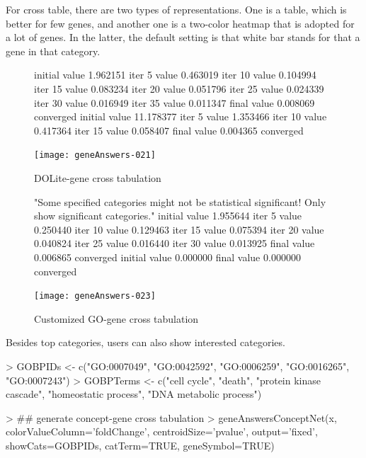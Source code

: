 \documentclass[a4paper]{article}
\begin{document}
For cross table, there are two types of representations. One is a table, which is better for few genes, and another one is a two-color heatmap that is adopted for a lot of genes. In the latter,  the default setting is that white bar stands for that a gene in that category.

 
\begin{figure}
\centering
\begin{Schunk}
\begin{Soutput}
initial  value 1.962151 
iter   5 value 0.463019
iter  10 value 0.104994
iter  15 value 0.083234
iter  20 value 0.051796
iter  25 value 0.024339
iter  30 value 0.016949
iter  35 value 0.011347
final  value 0.008069 
converged
initial  value 11.178377 
iter   5 value 1.353466
iter  10 value 0.417364
iter  15 value 0.058407
final  value 0.004365 
converged
\end{Soutput}
\end{Schunk}
\texttt{[image: geneAnswers-021]}
\caption{DOLite-gene cross tabulation}
\label{fig:DOLite-gene cross tabulation}
\end{figure}


\begin{figure}
\centering
\begin{Schunk}
\begin{Soutput}
[1] "Some specified categories might not be statistical significant! Only show significant categories."
initial  value 1.955644 
iter   5 value 0.250440
iter  10 value 0.129463
iter  15 value 0.075394
iter  20 value 0.040824
iter  25 value 0.016440
iter  30 value 0.013925
final  value 0.006865 
converged
initial  value 0.000000 
final  value 0.000000 
converged
\end{Soutput}
\end{Schunk}
\texttt{[image: geneAnswers-023]}
\caption{Customized GO-gene cross tabulation}
\label{fig: Customized GO-gene cross tabulation}
\end{figure}


Besides top categories, users can also show interested categories.
\begin{Schunk}
\begin{Sinput}
> GOBPIDs <- c("GO:0007049", "GO:0042592", "GO:0006259", "GO:0016265", "GO:0007243")
> GOBPTerms <- c("cell cycle", "death", "protein kinase cascade", "homeostatic process", "DNA metabolic process") 
\end{Sinput}
\end{Schunk}

\begin{Schunk}
\begin{Sinput}
> ## generate concept-gene cross tabulation
> geneAnswersConceptNet(x, colorValueColumn='foldChange', centroidSize='pvalue', output='fixed', showCats=GOBPIDs, catTerm=TRUE, geneSymbol=TRUE) 
\end{Sinput}
\end{Schunk}
\end{document}
